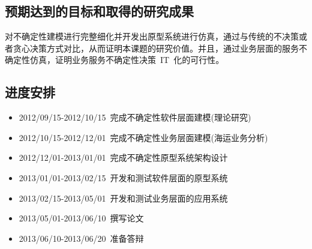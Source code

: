 %
%
%
%


\subsection{预期达到的目标和取得的研究成果}

对不确定性建模进行完整细化并开发出原型系统进行仿真，通过与传统的不决策或者贪心决策方式对比，从而证明本课题的研究价值。并且，通过业务层面的服务不确定性仿真，证明业务服务不确定性决策~IT~化的可行性。

\subsection{进度安排}
\begin{itemize}
    \item 2012/09/15-2012/10/15~完成不确定性软件层面建模(理论研究)
    \item 2012/10/15-2012/12/01~完成不确定性业务层面建模(海运业务分析)
    \item 2012/12/01-2013/01/01~完成不确定性原型系统架构设计
    \item 2013/01/01-2013/02/15~开发和测试软件层面的原型系统
    \item 2013/02/15-2013/05/01~开发和测试业务层面的应用系统
    \item 2013/05/01-2013/06/10~撰写论文
    \item 2013/06/10-2013/06/20~准备答辩
\end{itemize}


